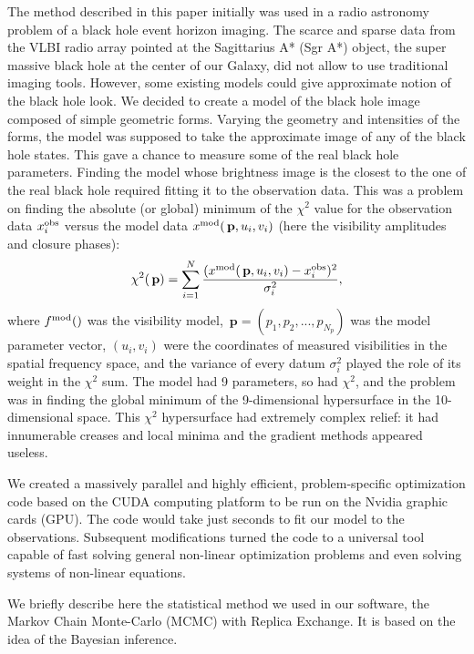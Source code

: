 \documentclass[preprint2]{aastex}
\newcommand{\bp}{\,\mathbf{p}}
\begin{document}
The method described in this paper initially was used in a radio astronomy problem of a black hole event horizon imaging. The scarce and sparse data from the VLBI radio array pointed at the Sagittarius A* (Sgr A*) object, the super massive black hole at the center of our Galaxy, did not allow to use traditional imaging tools. However, some existing models could give approximate notion of the black hole look. We decided to create a model of the black hole image composed of simple geometric forms. Varying the geometry and intensities of the forms, the model was supposed to take the approximate image of any of the black hole states. This gave a chance to measure some of the real black hole parameters. Finding the model whose brightness image is the closest to the one of the real black hole required fitting it to the observation data. This was a problem on finding the absolute (or global) minimum of the $\chi^2$ value for the observation data $x_i^{\rm obs}$ versus the model data $x^{\rm mod}(\bp,u_i,v_i)$ (here the visibility amplitudes and closure phases): 
\begin{equation}
  \label{chi2}
  \chi^2(\bp) = \sum_{i=1}^{N} \frac{(x^{\rm mod}(\bp,u_i,v_i) - x_i^{\rm obs})^2}{\sigma_i^2},
\end{equation}
where $f^{\rm mod}()$ was the visibility model,  $\bp=(p_1,p_2,...,p_{N_p})$ was the model parameter vector, $(u_i,v_i)$ were the coordinates of measured visibilities in the spatial frequency space, and the variance of every datum $\sigma_i^2$ played the role of its weight in the $\chi^2$ sum. The model had 9 parameters, so had $\chi^2$, and the problem was in finding the global minimum of the 9-dimensional hypersurface in the 10-dimensional space. This $\chi^2$ hypersurface had extremely complex relief: it had innumerable creases and local minima and the gradient methods appeared useless. 

We created a massively parallel and highly efficient, problem-specific optimization code based on the CUDA computing platform to be run on the Nvidia graphic cards (GPU). The code would take just seconds to fit our model to the observations. Subsequent modifications turned the code to a universal tool capable of fast solving general non-linear optimization problems and even solving systems of non-linear equations. 

We briefly describe here the statistical method we used in our software, the Markov Chain Monte-Carlo (MCMC) with Replica Exchange. It is based on the idea of the Bayesian inference. 
\end{document}
